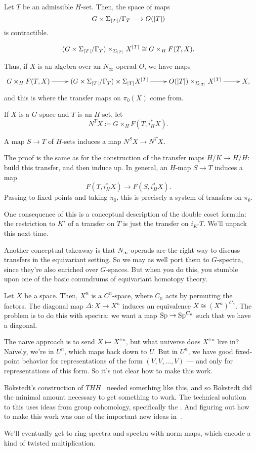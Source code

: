 Let $T$ be an admissible $H$-set. Then, the space of maps
\[G\times\Sigma_{\lvert T\rvert}/\Gamma_T\longrightarrow O(\lvert T\rvert)\]
is contractible.
\begin{lem}
\[(G\times\Sigma_{\lvert T\rvert}/\Gamma_T)\times_{\Sigma_{\lvert T\rvert}} X^{\lvert T\rvert} \cong G\times_H F(T,X).\]
\end{lem}
Thus, if $X$ is an algebra over an $N_\infty$-operad $O$, we have maps
\[\xymatrix{
	G\times_H F(T,X)\ar[r] & (G\times\Sigma_{\abs T}/\Gamma_T)\times\Sigma_{\abs T} X^{\abs T}\ar[r] & O(\abs
	T)\times_{\Sigma_{\abs T}} X^{\abs T}\ar[r] & X,
}\]
and this is where the transfer maps on $\pi_0(X)$ come from.

If $X$ is a $G$-space and $T$ is an $H$-set, let
\[N^TX\coloneqq G\times_H F(T, i_H^*X).\]
\begin{lem}
A map $S\to T$ of $H$-sets induces a map $N^S X\to N^T X$.
\end{lem}
The proof is the same as for the construction of the transfer maps $H/K\to H/H$: build this transfer, and then
induce up. In general, an $H$-map $S\to T$ induces a map
\[F(T, i_H^*X)\longrightarrow F(S, i_H^*X).\]
Passing to fixed points and taking $\pi_0$, this is precisely a system of transfers on $\pi_0$.
\begin{rem}
One consequence of this is a conceptual description of the double coset formula: the restriction to $K'$ of a
transfer on $T$ is just the transfer on $i_{K'}T$. We'll unpack this next time.
\end{rem}
Another conceptual takeaway is that $N_\infty$-operads are the right way to discuss transfers in the equivariant
setting. So we may as well port them to $G$-spectra, since they're also enriched over $G$-spaces. But when you do
this, you stumble upon one of the basic conundrums of equivariant homotopy theory.

Let $X$ be a space. Then, $X^n$ is a $C^n$-space, where $C_n$ acts by permuting the factors. The diagonal map
$\Delta\colon X\to X^n$ induces an equivalence $X\cong (X^n)^{C_n}$. The problem is to do this with spectra: we
want a map $\mathrm{Sp}\to\mathrm{Sp}^{C_n}$ such that we have a diagonal.

The naïve approach is to send $X\mapsto X^{\wedge n}$, but what universe does $X^{\wedge n}$ live in? Naïvely,
we're in $U^n$, which maps back down to $U$. But in $U^n$, we have good fixed-point behavior for representations of
the form $(V,V,\dotsc,V)$ --- and only for representations of this form. So it's not clear how to make this work.

Bökstedt's construction of $\mathit{THH}$~\cite{Bokstedt} needed something like this, and so Bökstedt did the
minimal amount necessary to get something to work. The technical solution to this uses ideas from group cohomology,
specifically the . And figuring out how to make this work was one of the important new ideas
in~\cite{HHR}.

We'll eventually get to ring spectra and spectra with norm maps, which encode a kind of twisted multiplication.

